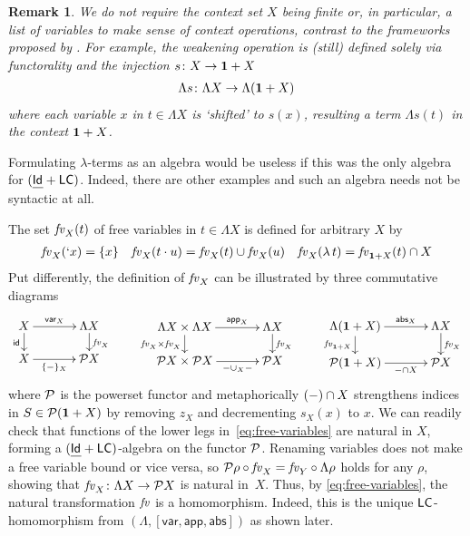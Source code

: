 \documentclass[acmsmall,review]{acmart}\settopmatter{printfolios=true,printccs=false,printacmref=false}
\theoremstyle{acmdefinition}
\newtheorem*{remark*}{Remark}
\begin{document}
\begin{remark*}
We do not require the context set $X$ being finite or, in particular, a list of variables to make sense of context operations, contrast to the frameworks proposed by \citet{Fiore1999,Allais2021}.
For example, the \emph{weakening} operation is (still) defined solely via functorality and the injection $s \colon X \to \mathbf{1} + X$
\begin{align}\label{eq:weakening}
  \Lambda s      \colon \Lambda X \to \Lambda(\mathbf{1} + X)
\end{align}
where each variable $x$ in $t \in \Lambda X$ is `shifted' to $s(x)$, resulting a term $\Lambda s(t)$ in the context $\mathbf{1} + X$.
  
\end{remark*}


Formulating $\lambda$-terms as an algebra would be useless if this was the only algebra for $(\underline{\mathsf{Id}_{}} + \mathsf{LC})$.
Indeed, there are other examples and such an algebra needs not be syntactic at all.
\begin{example}\label{ex:free-variables}
  The set $\mathit{fv}_X(t)$ of free variables in $t \in \Lambda X$ is defined for arbitrary $X$ by
  \begin{align*}
    \mathit{fv}_X(`x) & = \{x\} & \mathit{fv}_X(t \cdot u) & = \mathit{fv}_X(t) \cup \mathit{fv}_X(u) & \mathit{fv}_X(\lambda\,t) = \mathit{fv}_{\mathbf{1} + X}(t) \cap X
  \end{align*}
  Put differently, the definition of $\mathit{fv}_X$ can be illustrated by three commutative diagrams 
  \begin{equation}\label{eq:free-variables}
    \vcenter{
    \xymatrix@C+1em@R-1em{
      X \ar[r]^-{\mathsf{var}_X} \ar[d]_{\idfunc} & \Lambda X \ar[d]^{\fv_X} \\
      X \ar[r]_-{\{\blank\}_X} & \power X 
    }}
    \qquad
    \vcenter{
    \xymatrix@C+1em@R-1em{
      \Lambda X\times\Lambda X \ar[r]^-{\mathsf{app}_X} \ar[d]_{\fv_X \times \fv_X} & \Lambda X \ar[d]^{\fv_X} \\
      \power X\times\power X \ar[r]_-{\blank \cup_X \blank} & \power X 
    }}
    \qquad
    \vcenter{
    \xymatrix@C+1em@R-1em{
      \Lambda(\Unit + X) \ar[r]^-{\mathsf{abs}_X} \ar[d]_{\fv_{\Unit +X}} & \Lambda X \ar[d]^{\fv_X} \\
      \power(\Unit + X) \ar[r]_-{\blank \cap X} & \power X 
    }}
  \end{equation}
  where $\mathcal{P}$ is the powerset functor and metaphorically $({-})\cap X$ strengthens indices in $S \in \mathcal{P}(\mathbf{1} + X)$ by removing $z_X$ and decrementing $s_X(x)$ to $x$.
  We can readily check that functions of the lower legs in~\eqref{eq:free-variables} are natural in $X$, forming a $(\underline{\mathsf{Id}_{}} + \mathsf{LC})$-algebra on the functor $\mathcal{P}$. 
  Renaming variables does not make a free variable bound or vice versa, so $\mathcal{P}\rho  \circ \mathit{fv}_X = \mathit{fv}_Y \circ \Lambda\rho$ holds for any $\rho$, showing that $\mathit{fv}_X\colon \Lambda X \to \mathcal{P} X$ is natural in~$X$.
  Thus, by \eqref{eq:free-variables}, the natural transformation $\mathit{fv}$ is a homomorphism.
  Indeed, this is the unique $\mathsf{LC}$-homomorphism from $(\Lambda, [\mathsf{var}, \mathsf{app}, \mathsf{abs}])$ as shown later.
\end{example}
\end{document}
